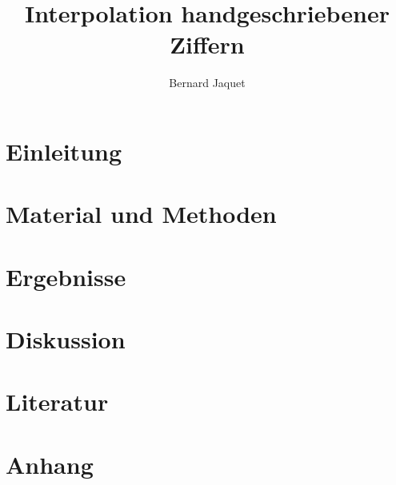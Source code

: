 \documentclass[a4paper,10pt]{article}
\title{Interpolation handgeschriebener Ziffern}
\author{Bernard Jaquet}
\date{\formatdate{12}{11}{2018}}
\begin{document}
	\maketitle
	\begin{multicols}{2}
		\begin{abstract}
			
		\end{abstract}
		\section{Einleitung}
		
		\section{Material und Methoden}
		
		\section{Ergebnisse}
		
		\section{Diskussion}
		
		\section{Literatur}
		
		\section{Anhang}
	
	\end{multicols}
\end{document}
